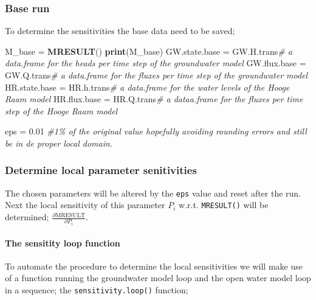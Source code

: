 \documentclass[
]{article}
\newenvironment{Shaded}{\begin{snugshade}}{\end{snugshade}}
\newcommand{\CommentTok}[1]{\textcolor[rgb]{0.56,0.35,0.01}{\textit{#1}}}
\newcommand{\FloatTok}[1]{\textcolor[rgb]{0.00,0.00,0.81}{#1}}
\newcommand{\FunctionTok}[1]{\textcolor[rgb]{0.13,0.29,0.53}{\textbf{#1}}}
\newcommand{\NormalTok}[1]{#1}
\newcommand{\OtherTok}[1]{\textcolor[rgb]{0.56,0.35,0.01}{#1}}
\begin{document}
\hypertarget{base-run}{%
\subsubsection{Base run}\label{base-run}}

To determine the sensitivities the base data need to be saved;

\begin{Shaded}
\begin{Highlighting}[]
\NormalTok{M\_base }\OtherTok{=} \FunctionTok{MRESULT}\NormalTok{()}
\FunctionTok{print}\NormalTok{(M\_base)}
\NormalTok{GW.state.base }\OtherTok{=}\NormalTok{ GW.H.trans}\CommentTok{\# a data.frame for the heads per time step of the groundwater model}
\NormalTok{GW.flux.base }\OtherTok{=}\NormalTok{ GW.Q.trans}\CommentTok{\# a data.frame for the fluxes per time step of the groundwater model}
\NormalTok{HR.state.base }\OtherTok{=}\NormalTok{ HR.h.trans}\CommentTok{\# a data.frame for the water levels of the Hooge Raam model}
\NormalTok{HR.flux.base }\OtherTok{=}\NormalTok{ HR.Q.trans}\CommentTok{\# a dataa.frame for the fluxes per time step of the Hooge Raam model}

\NormalTok{eps }\OtherTok{=} \FloatTok{0.01} \CommentTok{\#1\% of the original value hopefully avoiding rounding errors and still be in de proper local domain.}
\end{Highlighting}
\end{Shaded}

\hypertarget{determine-local-parameter-senitivities}{%
\subsubsection{Determine local parameter
senitivities}\label{determine-local-parameter-senitivities}}

The chosen parameters will be altered by the \texttt{eps} value and
reset after the run.\\
Next the local sensitivity of this parameter \(P_i\) w.r.t.
\texttt{MRESULT()} will be determined;
\(\frac{\partial \text{MRESULT}}{\partial P_i}\).

\hypertarget{the-sensitity-loop-function}{%
\paragraph{The sensitity loop
function}\label{the-sensitity-loop-function}}

To automate the procedure to determine the local sensitivities we will
make use of a function running the groundwater model loop and the open
water model loop in a sequence; the \texttt{sensitivity.loop()}
function;
\end{document}
